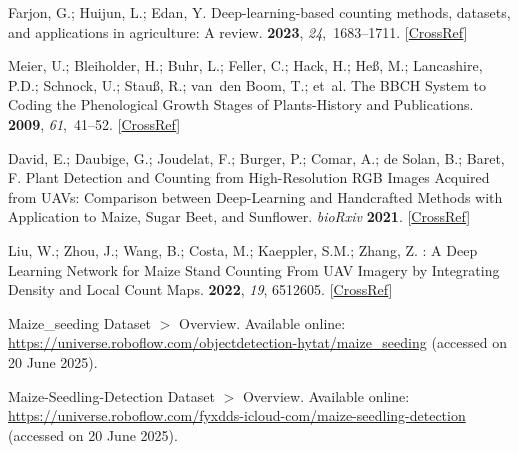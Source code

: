 \documentclass[12pt,a4paper,oneside]{report}
\begin{document}
\begin{thebibliography}{999}
Farjon, G.; Huijun, L.; Edan, Y.
\newblock Deep-learning-based counting methods, datasets, and applications in
agriculture: A review.
 {\bf 2023}, {\em 24},~1683--1711. [\href{http://dx.doi.org/10.1007/s11119-023-10034-8}{CrossRef}]

Meier, U.; Bleiholder, H.; Buhr, L.; Feller, C.; Hack, H.; He{\ss}, M.;
Lancashire, P.D.; Schnock, U.; Stau{\ss}, R.; van~den Boom, T.;  et~al.
\newblock The {{BBCH}} System to Coding the Phenological Growth Stages of
Plants-History and Publications.
 {\bf 2009}, {\em 61},~41--52. [\href{http://dx.doi.org/10.5073/JfK.2009.02.01}{CrossRef}]

David, E.; Daubige, G.; Joudelat, F.; Burger, P.; Comar, A.; {de Solan}, B.;
Baret, F.
\newblock Plant Detection and Counting from High-Resolution {{RGB}} Images
Acquired from {{UAVs}}: Comparison between Deep-Learning and Handcrafted
Methods with Application to Maize, Sugar Beet, and Sunflower. {\em bioRxiv} {\bf2021}. [\href{http://dx.doi.org/10.1101/2021.04.27.441631}{CrossRef}]

Liu, W.; Zhou, J.; Wang, B.; Costa, M.; Kaeppler, S.M.; Zhang, Z.
: {{A Deep Learning Network}} for {{Maize Stand
Counting From UAV Imagery}} by {{Integrating Density}} and {{Local Count
Maps}}.
 {\bf 2022}, {\em
19}, 6512605. [\href{http://dx.doi.org/10.1109/LGRS.2022.3186544}{CrossRef}]

Maize\_seeding {{Dataset}} {$>$} {{Overview}}.
\newblock Available online: \url{https://universe.roboflow.com/objectdetection-hytat/maize\_seeding} (accessed on 
20 June 2025).


Maize-Seedling-Detection {{Dataset}} {$>$} {{Overview}}.
\newblock
Available online: \url{https://universe.roboflow.com/fyxdds-icloud-com/maize-seedling-detection} (accessed on 20 June 2025).


\end{thebibliography}
\end{document}
